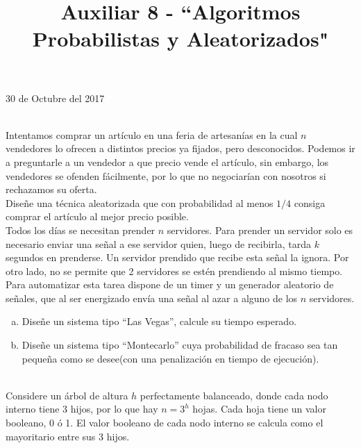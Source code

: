 \documentclass[dcc,uchile]{fcfmcourse}
\title{Auxiliar 8 - ``Algoritmos Probabilistas y Aleatorizados"}
\theoremstyle{plain}
\theoremstyle{definition}
\begin{document}
\maketitle
\begin{center}
30 de Octubre del 2017
\end{center}


\vspace{-1ex}


\begin{problems}
\\
Intentamos comprar un artículo en una feria de artesanías en la cual $n$ vendedores lo ofrecen a distintos precios ya fijados, pero desconocidos. Podemos ir a preguntarle a un vendedor a que precio vende el artículo, sin embargo, los vendedores se ofenden fácilmente, por lo que no negociarían con nosotros si rechazamos su oferta.\\
Diseñe una técnica aleatorizada que con probabilidad al menos $1/4$ consiga comprar el artículo al mejor precio posible.
\\
Todos los días se necesitan prender $n$ servidores. Para prender un servidor solo es necesario enviar una señal a ese servidor quien, luego de recibirla, tarda $k$ segundos en prenderse. Un servidor prendido que recibe esta señal la ignora. Por otro lado, no se permite que 2 servidores se estén prendiendo al mismo tiempo.\\
Para automatizar esta tarea dispone de un timer y un generador aleatorio de señales, que al ser energizado envía una señal al azar a alguno de los $n$ servidores.
\begin{enumerate}[a)]
    \item Diseñe un sistema tipo ``Las Vegas'', calcule su tiempo esperado.
    \item Diseñe un sistema tipo ``Montecarlo'' cuya probabilidad de fracaso sea tan pequeña como se desee(con una penalización en tiempo de ejecución).
\end{enumerate}
\\
Considere un árbol de altura $h$ perfectamente balanceado, donde cada nodo interno tiene $3$ hijos, por lo que hay $n=3^h$ hojas. Cada hoja tiene un valor booleano, 0 ó 1. El valor booleano de cada nodo interno se calcula como el mayoritario entre sus $3$ hijos.

\end{problems}
\end{document}
